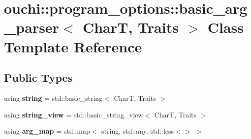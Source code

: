 \hypertarget{classouchi_1_1program__options_1_1basic__arg__parser}{}\section{ouchi\+::program\+\_\+options\+::basic\+\_\+arg\+\_\+parser$<$ CharT, Traits $>$ Class Template Reference}
\label{classouchi_1_1program__options_1_1basic__arg__parser}
\subsection*{Public Types}
\begin{DoxyCompactItemize}
\item 
\mbox{\label{classouchi_1_1program__options_1_1basic__arg__parser_ad284fad7cf296e71c8041d6530dee968}} 
using {\bfseries string} = std\+::basic\+\_\+string$<$ CharT, Traits $>$
\item 
\mbox{\label{classouchi_1_1program__options_1_1basic__arg__parser_ab3fb06c2be9cee76098da5cfdfb99ca4}} 
using {\bfseries string\+\_\+view} = std\+::basic\+\_\+string\+\_\+view$<$ CharT, Traits $>$
\item 
\mbox{\label{classouchi_1_1program__options_1_1basic__arg__parser_a78e3fc8e862012e973a00560099e6f09}} 
using {\bfseries arg\+\_\+map} = std\+::map$<$ string, std\+::any, std\+::less$<$$>$ $>$
\end{DoxyCompactItemize}
